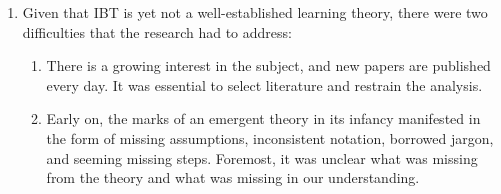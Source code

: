 \documentclass[
  a4paperpaper,
  a4paper,
  12pt,
  twoside,
  brazil,
  british,
  open=right]{scrbook}
\begin{document}
\begin{enumerate}
\def\labelenumi{\arabic{enumi}.}
\item
  Given that {IBT} is yet not a well-established learning theory, there
  were two difficulties that the research had to address:

  \begin{enumerate}
  \def\labelenumii{\arabic{enumii}.}
  \item
    There is a growing interest in the subject, and new papers are
    published every day. It was essential to select literature and
    restrain the analysis.
  \item
    Early on, the marks of an emergent theory in its infancy manifested
    in the form of missing assumptions, inconsistent notation, borrowed
    jargon, and seeming missing steps. Foremost, it was unclear what was
    missing from the theory and what was missing in our understanding.
  \end{enumerate}


\end{enumerate}
\end{document}

